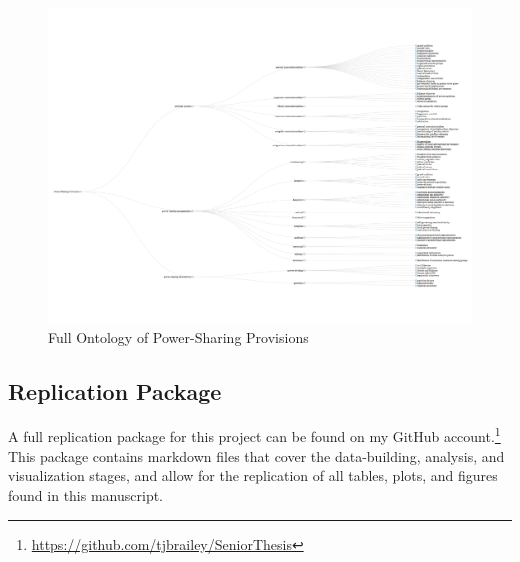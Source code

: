 \documentclass[12pt]{article}
\begin{document}
\begin{figure}
	\includegraphics[width = 9.5in]{psp_ontology_vis.png}
	\caption{Full Ontology of Power-Sharing Provisions}
\end{figure}

\subsection{Replication Package}
A full replication package for this project can be found on my GitHub account.\footnote{\url{https://github.com/tjbrailey/SeniorThesis}} This package contains markdown files that cover the data-building, analysis, and visualization stages, and allow for the replication of all tables, plots, and figures found in this manuscript. 
\end{document}

